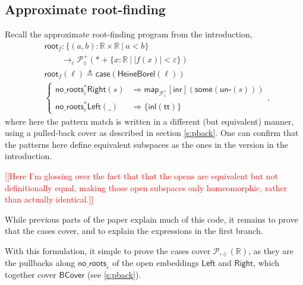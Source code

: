 \documentclass[conference]{IEEEtran}
\newcommand{\PLower}{\mathcal{P}_\lozenge}
\newcommand{\Viet}{\mathcal{P}_{\square\lozenge}}
\newcommand{\cto}{\to_c}
\newcommand{\R}{\mathbb{R}}
\newcommand{\map}[2]{\mathsf{map}_{#1}[{#2}]}
\newcommand{\suchthat}{\ |\ }
\newcommand{\One}{\ast}
\newcommand{\wildcard}{\_}
\newcommand{\Branch}{\Rightarrow}
\newcommand{\BCover}{\mathsf{BCover}}
\newcommand{\pback}[2]{#1^*#2}
\newcommand{\note}[1]{\textcolor{red}{[[{#1}]]}}
\begin{document}
\subsection{Approximate root-finding}
\label{s:bcov:root}

Recall the approximate root-finding program from the introduction,
\begin{align*}
&\mathsf{root}_f : \{ (a, b) : \R \times \R \suchthat a < b \}
  \\ &\qquad \cto \PLower^+(\One + \{ x : \R \suchthat |f(x)| < \varepsilon \})
\\ &\mathsf{root}_f(\ell) \triangleq \mathsf{case}(\mathsf{HeineBorel}(\ell))
\\ &\begin{cases}
\pback{\mathsf{no\_roots}_\varepsilon}{\mathsf{Right}}(s)
  &\Branch \map{\PLower^+}{\mathsf{inr}}(\mathsf{some}(\mathsf{un}\square(s)))
\\ \pback{\mathsf{no\_roots}_\varepsilon}{\mathsf{Left}}(\wildcard)
  &\Branch \{ \mathsf{inl}(\mathsf{tt}) \}
\end{cases},
\end{align*}
where here the pattern match is written in a different (but equivalent) manner, using a pulled-back cover as described in section \ref{s:pback}. One can confirm that the patterns here define equivalent subspaces as the ones in the version in the introduction.

\note{Here I'm glossing over the fact that that the opens are equivalent but not definitionally equal, making those open subspaces only homeomorphic, rather than actually identical.}

While previous parts of the paper explain much of this code, it remains to prove that the cases cover, and to explain the expressions in the first branch.

With this formulation, it simple to prove the cases cover $\Viet(\R)$, as they are the pullbacks along $\mathsf{no\_roots}_\varepsilon$ of the open embeddings $\mathsf{Left}$ and $\mathsf{Right}$, which together cover $\BCover$ (see \ref{s:pback}).
\end{document}
